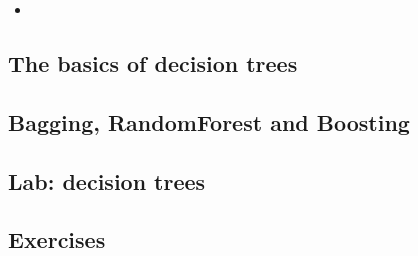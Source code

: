 \begin{itemize}
	\item
 \end{itemize}
\subsection{The basics of decision trees}

\subsection{Bagging, RandomForest and Boosting}

\subsection{Lab: decision trees}

\subsection{Exercises}

